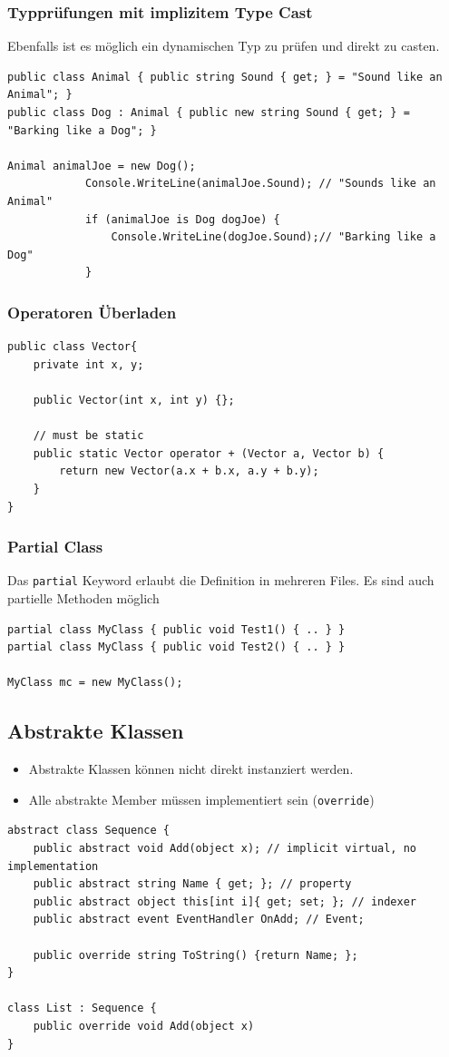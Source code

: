 \documentclass[
a4paper,
oneside,
10pt,
fleqn,
headsepline,
toc=listofnumbered, 
bibliography=totocnumbered]{scrartcl}
\begin{document}
\subsubsection{Typprüfungen mit implizitem Type Cast}
Ebenfalls ist es möglich ein dynamischen Typ zu prüfen und direkt zu casten.
\begin{lstlisting}
public class Animal { public string Sound { get; } = "Sound like an Animal"; }
public class Dog : Animal { public new string Sound { get; } = "Barking like a Dog"; }

Animal animalJoe = new Dog();
            Console.WriteLine(animalJoe.Sound); // "Sounds like an Animal"
            if (animalJoe is Dog dogJoe) {
                Console.WriteLine(dogJoe.Sound);// "Barking like a Dog"
            }
\end{lstlisting}


\subsubsection{Operatoren Überladen}
\begin{lstlisting}
public class Vector{
	private int x, y;
	
	public Vector(int x, int y) {};
	
	// must be static
	public static Vector operator + (Vector a, Vector b) {
		return new Vector(a.x + b.x, a.y + b.y);
	}						
}
\end{lstlisting}


\subsubsection{Partial Class}
Das \lstinline|partial| Keyword erlaubt die Definition in mehreren Files. Es sind auch partielle Methoden möglich
\begin{lstlisting}
partial class MyClass { public void Test1() { .. } }
partial class MyClass { public void Test2() { .. } }

MyClass mc = new MyClass();
\end{lstlisting}

\subsection{Abstrakte Klassen}
\begin{itemize}
	\item Abstrakte Klassen können nicht direkt instanziert werden.
	\item Alle abstrakte Member müssen implementiert sein (\lstinline|override|)
\end{itemize}
\begin{lstlisting}
abstract class Sequence {
	public abstract void Add(object x); // implicit virtual, no implementation
	public abstract string Name { get; }; // property
	public abstract object this[int i]{ get; set; }; // indexer
	public abstract event EventHandler OnAdd; // Event;
	
	public override string ToString() {return Name; }; 
}

class List : Sequence {
	public override void Add(object x)
}
\end{lstlisting}
\end{document}
